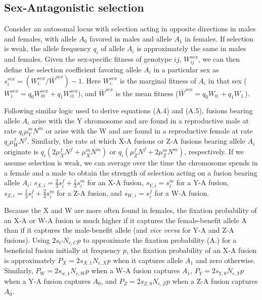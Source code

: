\subsection{Sex-Antagonistic selection}
Consider an autosomal locus with selection acting in opposite directions in males and females, with allele $A_0$ favored in males and allele $A_\text{1}$ in females. If selection is weak, the allele frequency $q_i$ of allele $A_i$ is approximately the same in males and females. Given the sex-specific fitness of genotype $ij$, $W^{sex}_{ij}$, we can then define the selection coefficient favoring allele $A_i$ in a particular sex as $s^{sex}_i=(W^{sex}_{i.}/\bar{W}^{sex})-\text{1}$. Here $W^{sex}_{i.}$ is the marginal fitness of $A_i$ in that sex ($W^{sex}_{i.}=q_0W^{sex}_{i0} + q_\text{1}W^{sex}_{i\text{1}}$), and $\bar{W}^{sex}$ is the mean fitness ($\bar{W}^{sex} = q_0W_{0.} + q_1W_{1.}$).

Following similar logic used to derive equations (A.4) and (A.5), fusions bearing allele $A_i$ arise with the Y chromosome and are found in a reproductive male at rate $q_i\mu^m_YN^m$  or arise with the W and are found in a reproductive female at rate $q_i\mu^f_WN^f$. Similarly, the rate at which X-A fusions or Z-A fusions bearing allele $A_i$ originate is $q_i(\text{2}\mu^f_XN^f + \mu^m_XN^m)$ or $q_i(\mu^f_ZN^f + \text{2}\mu^m_ZN^m)$, respectively. If we assume selection is weak, we can average over the time the chromosome spends in a female and a male to obtain the strength of selection acting on a fusion bearing allele $A_i$: $s_{X,i}=\frac{\text{2}}{\text{3}}s^f_i + \frac{\text{1}}{\text{3}}s^m_i$ for an X-A fusion, $s_{Y,i}=s^m_i$ for a Y-A fusion, $s_{Z,i}=\frac{\text{1}}{\text{3}}s^f_i + \frac{\text{2}}{\text{3}}s^m_i$  for a Z-A fusion, and $s_{W,i}=s^f_i$ for a W-A fusion.
 
Because the X and W are more often found in females, the fixation probability of an X-A or W-A fusion is much higher if it captures the female-benefit allele A than if it captures the male-benefit allele (and \emph{vice versa} for Y-A and Z-A fusions). Using $\text{2}s_CN_{e,C}p$ to approximate the fixation probability (A.) for a beneficial fusion initially at frequency $p$, the fixation probability of an X-A fusion is approximately $P_{X}=\text{2}s_{X,\text{1}}N_{e,X}p$ when it captures allele $A_\text{1}$ and zero otherwise. Similarly, $P_W = \text{2}s_{w,\text{1}}N_{e,W}p$ when a W-A fusion captures $A_\text{1}$, $P_Y = \text{2}s_{Y,0}N_{e,Y}p$ when a Y-A fusion captures $A_0$, and $P_Z=\text{2}s_{Z,0}N_{e,Z}p$ when a Z-A fusion captures $A_0$.

